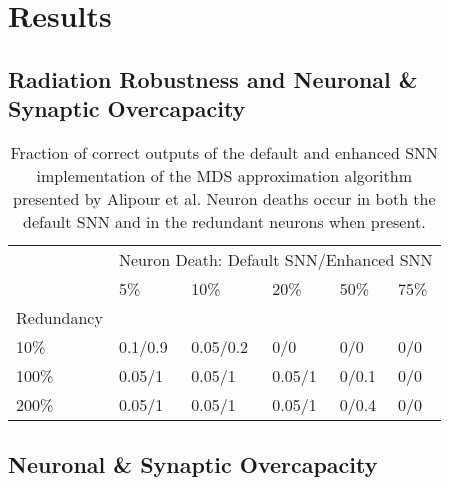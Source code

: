 \section{Results}\label{sec:results}

\subsection{Radiation Robustness and Neuronal \& Synaptic Overcapacity}\label{subsec:algorithm_performance}

\begin{table}[H]
\caption{Fraction of correct outputs of the default and enhanced SNN implementation of the MDS approximation algorithm presented by Alipour et al. Neuron deaths occur in both the default SNN and in the redundant neurons when present.}
\begin{tabular}{llllll}
           & \multicolumn{5}{l}{Neuron Death: Default SNN/Enhanced SNN} \\
           & 5\%    & 10\%    & 20\%    & 50\%    & 75\%    \\
Redundancy &        &         &         &         &         \\
10\%       & 0.1/0.9    & 0.05/0.2     & 0/0       & 0/0       & 0/0       \\
100\%      & 0.05/1      & 0.05/1       & 0.05/1       & 0/0.1     & 0/0       \\
200\%      & 0.05/1      & 0.05/1       & 0.05/1       & 0/0.4     & 0/0      
\end{tabular}
\end{table}


\subsection{Neuronal \& Synaptic Overcapacity}\label{subsec:results_neuronal_synaptic_overcapacity}

